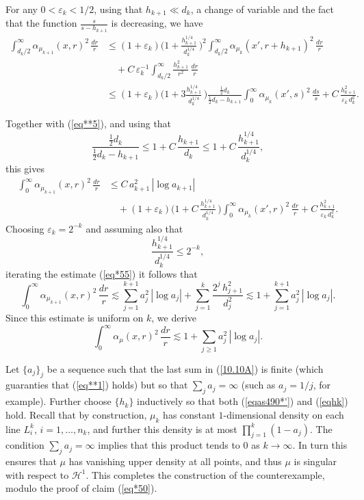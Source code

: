 \documentclass[11pt]{amsart}
\newcommand{\HH}{{\mathcal H}}
\newcommand{\rf}[1]{{(\ref{#1})}}
\newcommand{\ve}{{\varepsilon}}
\newcommand{\vv}{{\vspace{2mm}}}
\theoremstyle{definition}
\theoremstyle{remark}
\numberwithin{equation}{section}
\begin{document}
\vv
For any $0<\ve_k<1/2$, using that $h_{k+1}\ll d_k$, a change of variable and the fact that the function $\frac{s}{s-h_{k+1}}$ is decreasing, we have
\begin{align*}
\int_{d_{k}/2}^\infty\!
\alpha_{\mu_{k+1}}(x,r)^2\,\frac{dr}r & \leq 
(1+\ve_k)\biggl(1+ \frac{h_{k+1}^{1/4}}{d_k^{1/4}}\,\biggr)^2\int_{d_{k}/2}^\infty
\alpha_{\mu_{k}}(x',r+h_{k+1})^2\,\frac{dr}r \\& \quad+ C\,\ve_k^{-1} \int_{d_{k}/2}^\infty\frac{h_{k+1}^2}{r^2}\,\frac{dr}r\\
& \leq (1+\ve_k)\biggl(1+ 3\frac{h_{k+1}^{1/4}}{d_k^{1/4}}\,\biggr)\frac{\frac12d_k}{\frac12 d_k -h_{k+1}}\int_0^\infty\!\!
\alpha_{\mu_{k}}(x',s)^2\,\frac{ds}s + C\,\frac{h_{k+1}^2}{\ve_k\,d_{k}^2}.
\end{align*}

Together with \rf{eq**5}, and using that
$$\frac{\frac12d_k}{\frac12 d_k -h_{k+1}}\leq 1+ C\,\frac{h_{k+1}}{d_k} \leq 1+ C\,\frac{h_{k+1}^{1/4}}{d_k^{1/4}},$$
this gives
\begin{align}\label{eq*55}
\int_0^\infty
\alpha_{\mu_{k+1}}(x,r)^2\,\frac{dr}r &
\leq C\,a_{k+1}^2\,|\log a_{k+1}| \\ &\quad+ (1+\ve_k)
\biggl(1+ C\,\frac{h_{k+1}^{1/4}}{d_k^{1/4}}\,\biggr)\int_0^\infty
\alpha_{\mu_{k}}(x',r)^2\,\frac{dr}r + C\,\frac{h_{k+1}^2}{\ve_k\,d_{k}^2}.\nonumber
\end{align}
Choosing $\ve_k=2^{-k}$ and assuming also that
\begin{equation}\label{eqas490*'}
\frac{h_{k+1}^{1/4}}{d_k^{1/4}}\leq 2^{-k},
\end{equation}
 iterating the estimate \rf{eq*55} it follows that
$$\int_0^\infty
\alpha_{\mu_{k+1}}(x,r)^2\,\frac{dr}r \lesssim \sum_{j=1}^{k+1} a_j^2\,|\log a_j| +\sum_{j=1}^k
\frac{2^j\,h_{j+1}^2}{d_j^2} \lesssim 1+ \sum_{j=1}^{k+1} a_j^2\,|\log a_j|.$$
Since this estimate is uniform on $k$, we derive
\begin{equation}\label{10.10A}\int_0^\infty
\alpha_{\mu}(x,r)^2\,\frac{dr}r \lesssim 1 + \sum_{j\geq1} a_j^2\,|\log a_j| .
\end{equation}


Let $\{a_j\}_j$ be a sequence such that the last sum in \rf{10.10A} is finite (which guaranties that \rf{eq**1} holds)
but so that $\sum_j a_j=\infty$
(such as $a_j = 1/j$, for example). Further choose $\{h_k\}$ inductively so that
both \rf{eqas490*'} and \rf{eqhk} hold.
Recall that by construction, $\mu_k$ has constant $1$-dimensional density on each line $L_i^k$, $i=1,\ldots,n_k$, and further this density is at most
$\prod_{j=1}^k (1-a_j).$
The condition $\sum_j a_j=\infty$ implies that this product tends to $0$ as $k\to\infty$. In turn this ensures that $\mu$ has  vanishing upper density at all points, and thus $\mu$ is singular with respect
to $\HH^1$. This completes the construction of the counterexample, modulo the proof of claim \rf{eq*50}.
\end{document}

